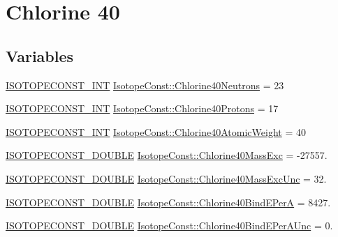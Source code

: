 \hypertarget{group___isotope_const-_chlorine-_cl40}{}\section{Chlorine 40}
\label{group___isotope_const-_chlorine-_cl40}
\subsection*{Variables}
\begin{DoxyCompactItemize}
\item 
\mbox{\hyperlink{group___isotope_const-_macros_ga5f18360b3e99483a35c32d789e62621c}{I\+S\+O\+T\+O\+P\+E\+C\+O\+N\+S\+T\+\_\+\+I\+NT}} \mbox{\hyperlink{group___isotope_const-_chlorine-_cl40_gabef7299db2173555b609e1d951a65f2f}{Isotope\+Const\+::\+Chlorine40\+Neutrons}} = 23
\item 
\mbox{\hyperlink{group___isotope_const-_macros_ga5f18360b3e99483a35c32d789e62621c}{I\+S\+O\+T\+O\+P\+E\+C\+O\+N\+S\+T\+\_\+\+I\+NT}} \mbox{\hyperlink{group___isotope_const-_chlorine-_cl40_ga99c8cb860a5a3206a0b2f1aaf3ba19d9}{Isotope\+Const\+::\+Chlorine40\+Protons}} = 17
\item 
\mbox{\hyperlink{group___isotope_const-_macros_ga5f18360b3e99483a35c32d789e62621c}{I\+S\+O\+T\+O\+P\+E\+C\+O\+N\+S\+T\+\_\+\+I\+NT}} \mbox{\hyperlink{group___isotope_const-_chlorine-_cl40_ga1d93d181ed5e0834f3a8ee0b7afcebdd}{Isotope\+Const\+::\+Chlorine40\+Atomic\+Weight}} = 40
\item 
\mbox{\hyperlink{group___isotope_const-_macros_ga8f45a7272ce02c0b4c65c44636ed719a}{I\+S\+O\+T\+O\+P\+E\+C\+O\+N\+S\+T\+\_\+\+D\+O\+U\+B\+LE}} \mbox{\hyperlink{group___isotope_const-_chlorine-_cl40_ga1b5ec545efeac4e0b2e7839cabdc1717}{Isotope\+Const\+::\+Chlorine40\+Mass\+Exc}} = -\/27557.
\item 
\mbox{\hyperlink{group___isotope_const-_macros_ga8f45a7272ce02c0b4c65c44636ed719a}{I\+S\+O\+T\+O\+P\+E\+C\+O\+N\+S\+T\+\_\+\+D\+O\+U\+B\+LE}} \mbox{\hyperlink{group___isotope_const-_chlorine-_cl40_gab73c5ff7e45bb4f9081406d84864eee1}{Isotope\+Const\+::\+Chlorine40\+Mass\+Exc\+Unc}} = 32.
\item 
\mbox{\hyperlink{group___isotope_const-_macros_ga8f45a7272ce02c0b4c65c44636ed719a}{I\+S\+O\+T\+O\+P\+E\+C\+O\+N\+S\+T\+\_\+\+D\+O\+U\+B\+LE}} \mbox{\hyperlink{group___isotope_const-_chlorine-_cl40_gac0c5ae5f919a6ccd91c7ef00fd8b84a2}{Isotope\+Const\+::\+Chlorine40\+Bind\+E\+PerA}} = 8427.
\item 
\mbox{\hyperlink{group___isotope_const-_macros_ga8f45a7272ce02c0b4c65c44636ed719a}{I\+S\+O\+T\+O\+P\+E\+C\+O\+N\+S\+T\+\_\+\+D\+O\+U\+B\+LE}} \mbox{\hyperlink{group___isotope_const-_chlorine-_cl40_ga791a41fbc1846ac5671d233d937f4ae1}{Isotope\+Const\+::\+Chlorine40\+Bind\+E\+Per\+A\+Unc}} = 0.

\end{DoxyCompactItemize}
